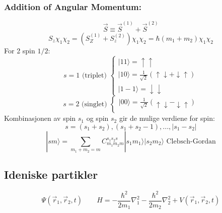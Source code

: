 \documentclass[a4paper,norsk, 10pt]{article}
\begin{document}
\subsubsection{Addition of Angular Momentum:}
\begin{equation}
\vec{S} \equiv \vec{S}^{(1)} + \vec{S}^{(2)}
\end{equation}
\begin{equation}
S_z\chi_1\chi_2 = (S_Z^{(1)} + S_z^{(2)})\chi_1\chi_2 = \hbar(m_1 + m_2)\chi_1\chi_2
\end{equation}
For 2 spin $1/2$:
\begin{equation}
s = 1 \text{ (triplet) }
\begin{cases}
|11\rangle = \uparrow \uparrow \\
|10\rangle = \frac{1}{\sqrt{2}}(\uparrow\downarrow + \downarrow\uparrow)\\
|1-1\rangle = \downarrow\downarrow
\end{cases}
\end{equation}
\begin{equation}
s = 2 \text{ (singlet) }
\begin{cases}
|00\rangle = \frac{1}{\sqrt{2}}(\uparrow\downarrow - \downarrow\uparrow)\\
\end{cases}
\end{equation}
Kombinasjonen av spin $s_1$ og spin $s_2$ gir de mulige verdiene for spin:
\begin{equation}
s = (s_1+s_2),  (s_1+s_2 - 1),...,|s_1-s_2|
\end{equation}
\begin{equation}
|sm\rangle = \sum_{m_1 + m_2 = m} C_{m_1m_2m}^{s_1s_2s}|s_1m_1\rangle|s_2m_2\rangle \text{ Clebsch-Gordan}
\end{equation}

\subsection{Ideniske partikler}
\begin{equation}
\Psi(\vec{r}_1,\vec{r}_2,t)\qquad H = -\frac{\hbar^2}{2m_1}\nabla^2_1 - \frac{\hbar^2}{2m_2}\nabla_2^2 + V(\vec{r}_1,\vec{r}_2,t)
\end{equation}
\end{document}
